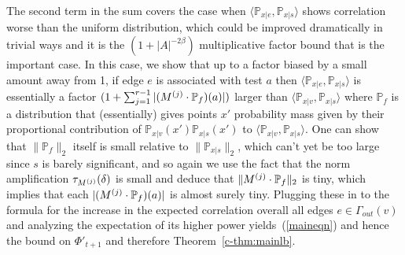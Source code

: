 The second term in the sum covers the case when
$\langle \mathbb{P}_{x|e},\mathbb{P}_{x|s}\rangle$ shows correlation 
worse than the uniform distribution, which could be improved dramatically
in trivial ways and it is the $(1+|A|^{-2\beta})$ multiplicative factor bound
that is the important case.
In this case, we show that up to a factor biased by a small amount away
from 1, if edge $e$ is associated with test $a$ then
$\langle \mathbb{P}_{x|e},\mathbb{P}_{x|s}\rangle$ is essentially
a factor $(1+\sum_{j=1}^{r-1} |(M^{(j)}\cdot\mathbb{P}_f)(a)|)$ larger
than $\langle \mathbb{P}_{x|v},\mathbb{P}_{x|s}\rangle$ where $\mathbb{P}_f$
is a distribution that (essentially) gives points $x'$ probability mass given
by their proportional contribution of $\mathbb{P}_{x|v}(x')\mathbb{P}_{x|s}(x')$ to
$\langle \mathbb{P}_{x|v},\mathbb{P}_{x|s}\rangle$.
One can show that $\|\mathbb{P}_f\|_2$ itself is small relative to
$\|\mathbb{P}_{x|s}\|_2$, which can't yet be too large since $s$ is barely
significant, and so again we use the fact that the norm amplification 
$\tau_{M^{(j)}}(\delta)$ is small and deduce that $\|M^{(j)}\cdot \mathbb{P}_f\|_2$ is
tiny, which implies that each $|(M^{(j)}\cdot \mathbb{P}_f)(a)|$ is almost
surely tiny.  Plugging these in to the formula for the increase in 
the expected correlation overall all edges $e\in \Gamma_{out}(v)$ 
and analyzing the expectation of its higher
power yields~(\ref{maineqn}) and hence the bound on $\Phi'_{t+1}$ and
therefore Theorem~\ref{c-thm:mainlb}.
\newpage
